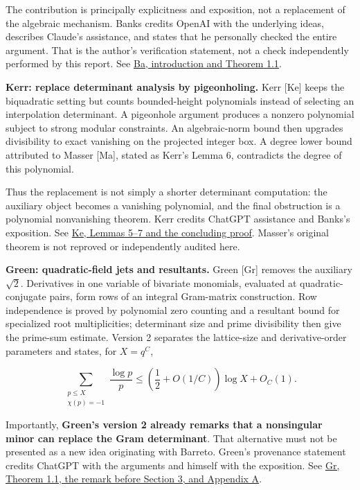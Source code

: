 \documentclass[11pt]{article}
\begin{document}
The contribution is principally explicitness and exposition, not a replacement of the algebraic mechanism. Banks credits OpenAI with the underlying ideas, describes Claude's assistance, and states that he personally checked the entire argument. That is the author's verification statement, not a check independently performed by this report. See \href{https://arxiv.org/html/2610.15483v1}{Ba, introduction and Theorem 1.1}.

\textbf{Kerr: replace determinant analysis by pigeonholing.} Kerr {[}Ke{]} keeps the biquadratic setting but counts bounded-height polynomials instead of selecting an interpolation determinant. A pigeonhole argument produces a nonzero polynomial subject to strong modular constraints. An algebraic-norm bound then upgrades divisibility to exact vanishing on the projected integer box. A degree lower bound attributed to Masser {[}Ma{]}, stated as Kerr's Lemma 6, contradicts the degree of this polynomial.

Thus the replacement is not simply a shorter determinant computation: the auxiliary object becomes a vanishing polynomial, and the final obstruction is a polynomial nonvanishing theorem. Kerr credits ChatGPT assistance and Banks's exposition. See \href{https://arxiv.org/html/2610.21099v1}{Ke, Lemmas 5--7 and the concluding proof}. Masser's original theorem is not reproved or independently audited here.

\textbf{Green: quadratic-field jets and resultants.} Green {[}Gr{]} removes the auxiliary \(\sqrt2\). Derivatives in one variable of bivariate monomials, evaluated at quadratic-conjugate pairs, form rows of an integral Gram-matrix construction. Row independence is proved by polynomial zero counting and a resultant bound for specialized root multiplicities; determinant size and prime divisibility then give the prime-sum estimate. Version 2 separates the lattice-size and derivative-order parameters and states, for \(X=q^C\),

\[
\sum_{\substack{p\le X\\\chi(p)=-1}}\frac{\log p}{p}
\le\left(\frac12+O(1/C)\right)\log X+O_C(1).
\]

Importantly, \textbf{Green's version 2 already remarks that a nonsingular minor can replace the Gram determinant}. That alternative must not be presented as a new idea originating with Barreto. Green's provenance statement credits ChatGPT with the arguments and himself with the exposition. See \href{https://hexagonmath.org/pdf/2610.00311v2}{Gr, Theorem 1.1, the remark before Section 3, and Appendix A}.
\end{document}
